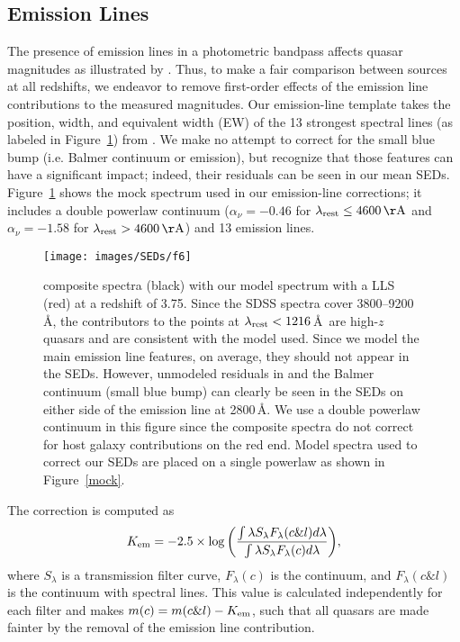 \subsection{Emission Lines}
\label{sec:emission}

The presence of emission lines in a photometric bandpass affects quasar magnitudes as illustrated by \citet[][e.g., see their Figures 8 and 17]{Richards:2006a}.  Thus, to make a fair comparison between sources at all redshifts, we endeavor to remove first-order effects of the emission line contributions to the measured magnitudes.  Our emission-line template takes the position, width, and equivalent width (EW) of the 13 strongest spectral lines (as labeled in Figure~\ref{van}) from \citet{Vanden-Berk:2001}.  We make no attempt to correct for the small blue bump (i.e. 
Balmer continuum or  emission), but recognize that those features can have a significant impact; indeed, their residuals can be seen in our mean SEDs.  Figure~\ref{van} shows the mock spectrum used in our emission-line corrections; it includes a double powerlaw continuum ($\alpha_{\nu}=-0.46$ for $\lambda_{{\rm rest}} \leq 4600\,{\rm \AA}$ and $\alpha_{\nu}=-1.58$ for $\lambda_{{\rm rest}}>4600\,{\rm \AA}$) and 13 emission lines.  

\begin{figure}[t]
 \centering
 \texttt{[image: images/SEDs/f6]}
 \caption[Model quasar spectrum]{\citet{Vanden-Berk:2001} composite spectra (black) with our model spectrum with a LLS (red) at a redshift of 3.75.  Since the SDSS spectra cover 3800--9200\,\AA, the contributors to the points at $\lambda_{{\rm rest}}<1216$\,\AA\ are high-$z$ quasars and are consistent with the model used. Since we model the main emission line features, on average, they should not appear in the SEDs.  However, unmodeled residuals in  and the Balmer continuum (small blue bump) can clearly be seen in the SEDs on either side of the  emission line at 2800\,\AA. We use a double powerlaw continuum in this figure since the composite spectra do not correct for host galaxy contributions on the red end.  Model spectra used to correct our SEDs are placed on a single powerlaw as shown in Figure~\ref{mock}.}
 \label{van}
\end{figure}

The correction is computed as
\begin{equation}  
K_{\rm em} = -2.5\times \log{\left( \frac{\int \lambda S_{\lambda} F_{\lambda}(c\&l) d\lambda}{\int \lambda S_{\lambda} F_{\lambda}(c) d\lambda}\right)},
\end{equation}
where $S_{\lambda}$ is a transmission filter curve, $F_{\lambda}(c)$ is the continuum, and $F_{\lambda}(c\&l)$ is the continuum with spectral lines.
This value is calculated independently for each filter and makes $m(c) = m(c\&l)-K_{\rm em}$, such that all quasars are made fainter by the removal of the emission line contribution.


